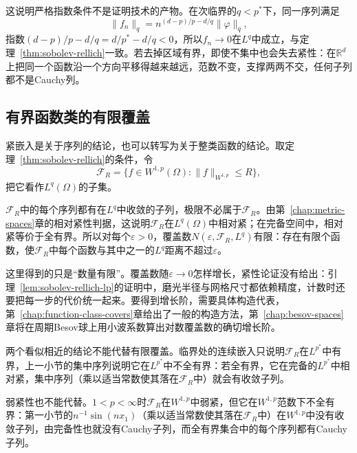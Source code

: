 这说明严格指数条件不是证明技术的产物。在次临界的$q<p^*$下，同一序列满足
\[
\lVert f_n\rVert_q=n^{(d-p)/p-d/q}\lVert\varphi\rVert_q,
\]
指数$(d-p)/p-d/q=d/p^*-d/q<0$，所以$f_n\to0$在$L^q$中成立，与定理~\ref{thm:sobolev-rellich}一致。若去掉区域有界，即使不集中也会失去紧性：在$\mathbb R^d$上把同一个函数沿一个方向平移得越来越远，范数不变，支撑两两不交，任何子列都不是Cauchy列。

\subsection{有界函数类的有限覆盖}
\label{sec:sobolev-finite-covers}

紧嵌入是关于序列的结论，也可以转写为关于整类函数的结论。取定理~\ref{thm:sobolev-rellich}的条件，令
\[
\mathcal F_R=\{f\in W^{1,p}(\Omega):\lVert f\rVert_{W^{1,p}}\leq R\},
\]
把它看作$L^q(\Omega)$的子集。

$\mathcal F_R$中的每个序列都有在$L^q$中收敛的子列，极限不必属于$\mathcal F_R$。由第~\ref{chap:metric-spaces}章的相对紧性判据，这说明$\mathcal F_R$在$L^q(\Omega)$中相对紧；在完备空间中，相对紧等价于全有界。所以对每个$\varepsilon>0$，覆盖数$N(\varepsilon,\mathcal F_R,L^q)$有限：存在有限个函数，使$\mathcal F_R$中每个函数与其中之一的$L^q$距离不超过$\varepsilon$。

这里得到的只是“数量有限”。覆盖数随$\varepsilon\to0$怎样增长，紧性论证没有给出：引理~\ref{lem:sobolev-rellich-lp}的证明中，磨光半径与网格尺寸都依赖精度，计数时还要把每一步的代价统一起来。要得到增长阶，需要具体构造代表，第~\ref{chap:function-class-covers}章给出了一般的构造方法，第~\ref{chap:besov-spaces}章将在周期Besov球上用小波系数算出对数覆盖数的确切增长阶。

两个看似相近的结论不能代替有限覆盖。临界处的连续嵌入只说明$\mathcal F_R$在$L^{p^*}$中有界，上一小节的集中序列说明它在$L^{p^*}$中不全有界：若全有界，它在完备的$L^{p^*}$中相对紧，集中序列（乘以适当常数使其落在$\mathcal F_R$中）就会有收敛子列。

弱紧性也不能代替。$1<p<\infty$时$\mathcal F_R$在$W^{1,p}$中弱紧，但它在$W^{1,p}$范数下不全有界：第一小节的$n^{-1}\sin(nx_1)$（乘以适当常数使其落在$\mathcal F_R$中）在$W^{1,p}$中没有收敛子列，由完备性也就没有Cauchy子列，而全有界集合中的每个序列都有Cauchy子列。
